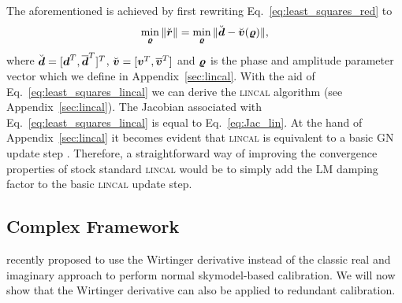 \documentclass[useAMS,usenatbib]{mn2e}
\newcommand{\bz}{\bmath{z}}
\newcommand{\br}{\bmath{r}}
\newcommand{\bg}{\bmath{g}}
\newcommand{\bd}{\bmath{d}}
\newcommand{\bv}{\bmath{v}}
\newcommand{\by}{\bmath{y}}
\newcommand{\conj}[1]{\overline{#1}}
\begin{document}
The aforementioned is achieved by first rewriting Eq.~\eqref{eq:least_squares_red} to
\begin{equation}
\label{eq:least_squares_lincal}
\min_{\bmath{\varrho}} \|\breve{\br}\| = \min_{\bmath{\varrho}} \|\breve{\bd} - \breve{\bv}(\bmath{\varrho})\|, 
\end{equation}
where $\breve{\bd} = [\bd^T,\conj{\bd}^T]^T$, $\breve{\bv} = [\bv^T,\conj{\bv}^T]$ and $\bmath{\varrho}$ is the phase and amplitude parameter vector which we define in Appendix~\ref{sec:lincal}. 
With the aid of Eq.~\eqref{eq:least_squares_lincal} we can derive the \textsc{lincal} algorithm (see Appendix~\ref{sec:lincal}).
The Jacobian associated with Eq.~\eqref{eq:least_squares_lincal} is equal to Eq.~\eqref{eq:Jac_lin}. 
At the hand of Appendix~\ref{sec:lincal} it becomes evident that \textsc{lincal} is equivalent to a basic GN update step \citep{Kurien2016}. 
Therefore, a straightforward way of improving the convergence properties of stock standard \textsc{lincal} would be to simply add the LM damping factor to the basic \textsc{lincal} update step. 


\subsection{Complex Framework}
\label{sec:w}

\citet{Smirnov2015} recently proposed to use the Wirtinger derivative instead of the classic real and imaginary approach to perform normal skymodel-based calibration. We will now show
that the Wirtinger derivative can also be applied to redundant calibration.

\end{document}
